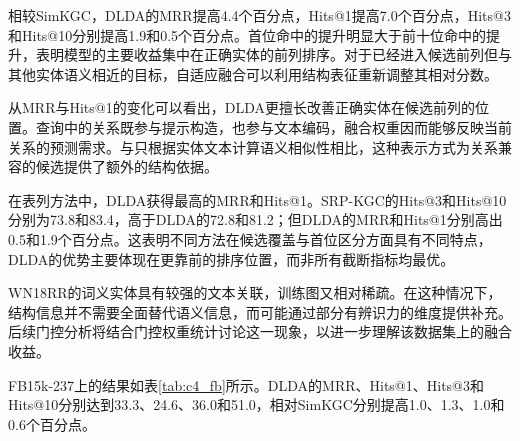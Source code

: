 相较SimKGC，DLDA的MRR提高4.4个百分点，Hits@1提高7.0个百分点，Hits@3和Hits@10分别提高1.9和0.5个百分点。首位命中的提升明显大于前十位命中的提升，表明模型的主要收益集中在正确实体的前列排序。对于已经进入候选前列但与其他实体语义相近的目标，自适应融合可以利用结构表征重新调整其相对分数。

从MRR与Hits@1的变化可以看出，DLDA更擅长改善正确实体在候选前列的位置。查询中的关系既参与提示构造，也参与文本编码，融合权重因而能够反映当前关系的预测需求。与只根据实体文本计算语义相似性相比，这种表示方式为关系兼容的候选提供了额外的结构依据。

在表列方法中，DLDA获得最高的MRR和Hits@1。SRP-KGC的Hits@3和Hits@10分别为73.8和83.4，高于DLDA的72.8和81.2；但DLDA的MRR和Hits@1分别高出0.5和1.9个百分点。这表明不同方法在候选覆盖与首位区分方面具有不同特点，DLDA的优势主要体现在更靠前的排序位置，而非所有截断指标均最优。

WN18RR的词义实体具有较强的文本关联，训练图又相对稀疏。在这种情况下，结构信息并不需要全面替代语义信息，而可能通过部分有辨识力的维度提供补充。后续门控分析将结合门控权重统计讨论这一现象，以进一步理解该数据集上的融合收益。



FB15k-237上的结果如表\ref{tab:c4_fb}所示。DLDA的MRR、Hits@1、Hits@3和Hits@10分别达到33.3、24.6、36.0和51.0，相对SimKGC分别提高1.0、1.3、1.0和0.6个百分点。

